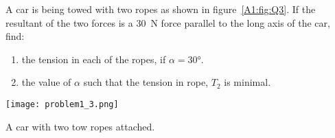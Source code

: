 A car is being towed with two ropes as shown in figure~\ref{A1:fig:Q3}. If the resultant of the two forces is a \SI{30}{\N} force parallel to the long axis of the car, find:
\begin{enumerate}
	\item the tension in each of the ropes, if $\alpha = \ang{30}$.
	\item the value of $\alpha$ such that the tension in rope, $T_2$ is minimal.
\end{enumerate}
\begin{marginfigure}[-20mm]
	\centering
	\texttt{[image: problem1\_3.png]}
	\caption{A car with two tow ropes attached.}
	\label{A1:fig:Q3}
\end{marginfigure}